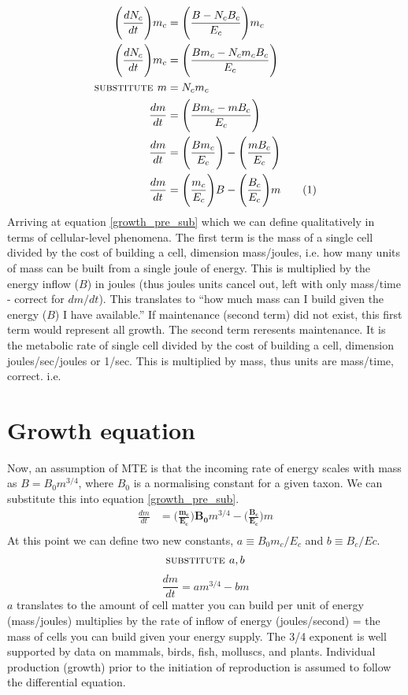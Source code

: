 \documentclass[a4paper]{article} %
\newcommand\numberthis{\addtocounter{equation}{1}\tag{\theequation}}
\begin{document}
\begin{align*}
    \Bigg(\frac{dN_{c}}{dt}\Bigg)m_c &= \Bigg(\frac{B - N_{c}B_{c}}{E_{c}}\Bigg)m_c \\
    \Bigg(\frac{dN_{c}}{dt}\Bigg)m_c &= \Bigg(\frac{Bm_c - N_{c}m_{c}B_{c}}{E_c}\Bigg) \\
    \textsc{substitute } m &= N_{c}m_{c} \\
    \frac{dm}{dt} &= \Bigg(\frac{Bm_c - mB_{c}}{E_c}\Bigg) \\
    \frac{dm}{dt} &= \Bigg(\frac{Bm_c}{E_c}\Bigg) - \Bigg(\frac{mB_{c}}{E_c}\Bigg) \\
    \frac{dm}{dt} &= \Bigg(\frac{m_c}{E_c}\Bigg)B - \Bigg(\frac{B_{c}}{E_c}\Bigg)m \numberthis \label{growth_pre_sub}
\end{align*}
Arriving at equation \eqref{growth_pre_sub} which we can define qualitatively in terms of cellular-level phenomena. The first term is the mass of a single cell divided by the cost of building a cell, dimension mass/joules, i.e. how many units of mass can be built from a single joule of energy. This is multiplied by the energy inflow ($B$) in joules (thus joules units cancel out, left with only mass/time - correct for $dm/dt$). This translates to ``how much mass can I build given the energy ($B$) I have available.'' If maintenance (second term) did not exist, this first term would represent all growth. The second term reresents maintenance. It is the metabolic rate of single cell divided by the cost of building a cell, dimension joules/sec/joules or 1/sec. This is multiplied by mass, thus units are mass/time, correct. i.e. 
\section{Growth equation}
Now, an assumption of MTE is that the incoming rate of energy scales with mass as $B = B_{0}m^{3/4}$, where $B_0$ is a normalising constant for a given taxon. We can substitute this into equation \ref{growth_pre_sub}.
\begin{align*}
    \frac{dm}{dt} &= \bm{\Bigg(\frac{m_c}{E_c}\Bigg)B_{0}}m^{3/4} - \bm{\Bigg(\frac{B_{c}}{E_c}\Bigg)}m \\
\end{align*}
At this point we can define two new constants, $a \equiv B_{0}m_{c}/E_{c}$ and $b \equiv B_{c}/E{c}$.
\begin{align*}
    \textsc{substitute }a, b
\end{align*}
\begin{equation}
    \frac{dm}{dt} = am^{3/4} - bm \label{west_model}
\end{equation}
$a$ translates to the amount of cell matter you can build per unit of energy (mass/joules) multiplies by the rate of inflow of energy (joules/second) = the mass of cells you can build given your energy supply. The 3/4 exponent is well supported by data on mammals, birds, fish, molluscs, and plants. Individual production (growth) prior to the initiation of reproduction is assumed to follow the differential equation.
\end{document}

